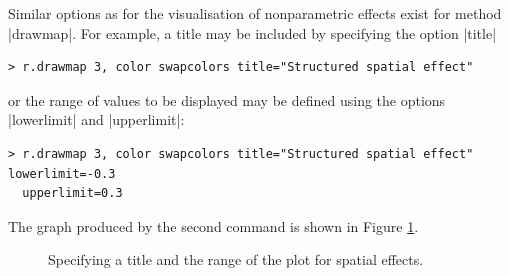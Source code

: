 Similar options as for the visualisation of nonparametric effects exist for method |drawmap|. For example, a title may be
included by specifying the option |title|

\begin{verbatim}
> r.drawmap 3, color swapcolors title="Structured spatial effect"
\end{verbatim}

or the range of values to be displayed may be defined using the options |lowerlimit| and |upperlimit|:

\begin{verbatim}
> r.drawmap 3, color swapcolors title="Structured spatial effect" lowerlimit=-0.3
  upperlimit=0.3
\end{verbatim}

The graph produced by the second command is shown in Figure \ref{reml:spat4}.

\begin{figure}[ht]
\begin{center}
{\it\caption{Specifying a title and the range of the plot for
spatial effects.\label{reml:spat4}}}
\end{center}
\end{figure}
